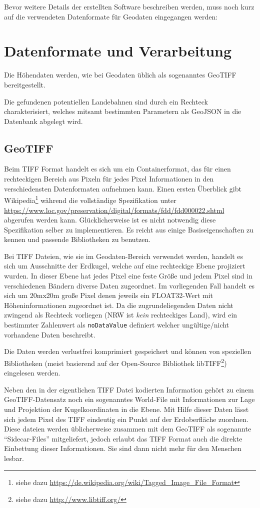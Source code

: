 \documentclass[10pt,a4paper]{report}
\begin{document}
Bevor weitere Details der erstellten Software beschreiben werden, muss noch kurz auf die verwendeten Datenformate für Geodaten eingegangen werden:

\section{Datenformate und Verarbeitung}
Die Höhendaten werden, wie bei Geodaten üblich als sogenanntes GeoTIFF bereitgestellt. 

Die gefundenen potentiellen Landebahnen sind durch ein Rechteck charakterisiert, welches mitsamt bestimmten Parametern als GeoJSON in die Datenbank abgelegt wird.

\subsection{GeoTIFF}
Beim TIFF Format handelt es sich um ein Containerformat, das für einen rechteckigen Bereich aus Pixeln für jedes Pixel Informationen in den verschiedensten Datenformaten aufnehmen kann. Einen ersten Überblick gibt Wikipedia\footnote{siehe dazu \url{https://de.wikipedia.org/wiki/Tagged_Image_File_Format}} während die vollständige Spezifikation unter \url{https://www.loc.gov/preservation/digital/formats/fdd/fdd000022.shtml} abgerufen werden kann. Glücklicherweise ist es nicht notwendig diese Spezifikation selber zu implementieren. Es reicht aus einige Basiseigenschaften zu kennen und passende Bibliotheken zu benutzen.

Bei TIFF Dateien, wie sie im Geodaten-Bereich verwendet werden, handelt es sich um Ausschnitte der Erdkugel, welche auf eine rechteckige Ebene projiziert wurden. In dieser Ebene hat jedes Pixel eine feste Größe und jedem Pixel sind in verschiedenen Bändern diverse Daten zugeordnet. Im vorliegenden Fall handelt es sich um 20mx20m große Pixel denen jeweils ein FLOAT32-Wert mit Höheninformationen zugeordnet ist.
Da die zugrundeliegenden Daten nicht zwingend als Rechteck vorliegen (NRW ist \emph{kein} rechteckiges Land), wird ein bestimmter Zahlenwert als \verb|noDataValue| definiert welcher ungültige/nicht vorhandene Daten beschreibt.

Die Daten werden verlustfrei komprimiert gespeichert und können von speziellen Bibliotheken (meist basierend auf der Open-Source Bibliothek libTIFF\footnote{siehe dazu \url{http://www.libtiff.org/}}) eingelesen werden.

Neben den in der eigentlichen TIFF Datei kodierten Information gehört zu einem GeoTIFF-Datensatz noch ein sogenanntes World-File mit Informationen zur Lage und Projektion der Kugelkoordinaten in die Ebene. Mit Hilfe dieser Daten lässt sich jedem Pixel des TIFF eindeutig ein Punkt auf der Erdoberfläche zuordnen. Diese dateien werden üblicherweise zusammen mit dem GeoTIFF als sogenannte "`Sidecar-Files"' mitgeliefert, jedoch erlaubt das TIFF Format auch die direkte Einbettung dieser Informationen. Sie sind dann nicht mehr für den Menschen lesbar. 
\end{document}
